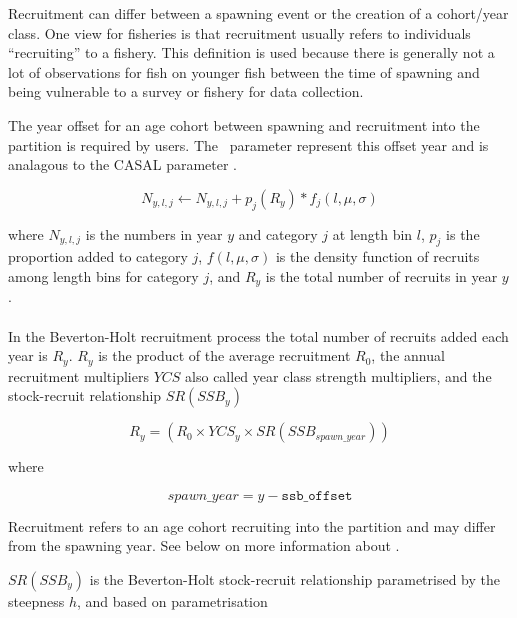 Recruitment can differ between a spawning event or the creation of a cohort/year class. One view for fisheries is that recruitment usually refers to individuals \enquote{recruiting} to a fishery. This definition is used because there is generally not a lot of observations for fish on younger fish between the time of spawning and being vulnerable to a survey or fishery for data collection.

The year offset for an age cohort between spawning and recruitment into the partition is required by users. The \CNAME\ parameter  represent this offset year and is analagous to the CASAL parameter .


\begin{equation}
N_{y,l,j} \leftarrow N_{y,l,j} + p_j(R_y) * f_j(l,\mu, \sigma)
\end{equation}

where $N_{y,l,j}$ is the numbers in year $y$ and category $j$ at length bin $l$, $p_j$ is the proportion added to category $j$, \(f(l,\mu, \sigma)\) is the density function of recruits among length bins for category \(j\), and $R_y$ is the total number of recruits in year $y$.


\paragraph{}\label{sec:Process-Length-RecruitmentBevertonHolt}

In the Beverton-Holt recruitment process the total number of recruits added each year is $R_y$. $R_y$ is the product of the average recruitment $R_0$, the annual recruitment multipliers $YCS$ also called year class strength multipliers, and the stock-recruit relationship $SR(SSB_y)$


\begin{equation}\label{eq:BH}
R_{y} = (R_0 \times YCS_{y} \times SR(SSB_{spawn\_year}))
\end{equation}

where

\begin{equation}\label{eq:year_class}
spawn\_year = y - \texttt{ssb\_offset}
\end{equation}

Recruitment refers to an age cohort recruiting into the partition and may differ from the spawning year. See below on more information about .

$SR(SSB_y)$ is the Beverton-Holt stock-recruit relationship parametrised by the steepness $h$, and based on \cite{mace_doonan_88} parametrisation

